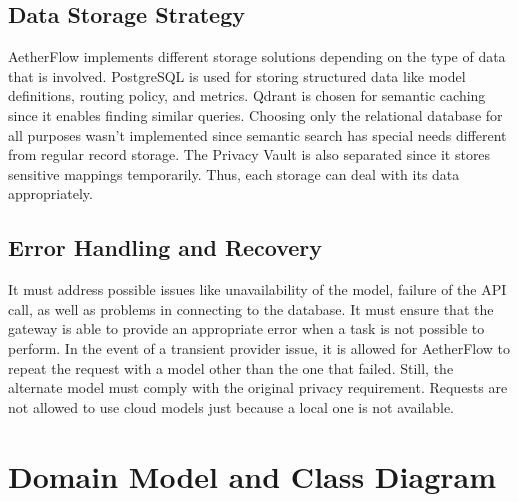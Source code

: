 \documentclass{FastFyp}
\begin{document}
\subsection{Data Storage Strategy}

AetherFlow implements different storage solutions depending on the type of data that is involved. PostgreSQL is used for storing structured data like model definitions, routing policy, and metrics. Qdrant is chosen for semantic caching since it enables finding similar queries.
Choosing only the relational database for all purposes wasn’t implemented since semantic search has special needs different from regular record storage. The Privacy Vault is also separated since it stores sensitive mappings temporarily. Thus, each storage can deal with its data appropriately.

\subsection{Error Handling and Recovery}

It must address possible issues like unavailability of the model, failure of the API call, as well as problems in connecting to the database. It must ensure that the gateway is able to provide an appropriate error when a task is not possible to perform.
In the event of a transient provider issue, it is allowed for AetherFlow to repeat the request with a model other than the one that failed. Still, the alternate model must comply with the original privacy requirement. Requests are not allowed to use cloud models just because a local one is not available.

\section{Domain Model and Class Diagram}
\end{document}
